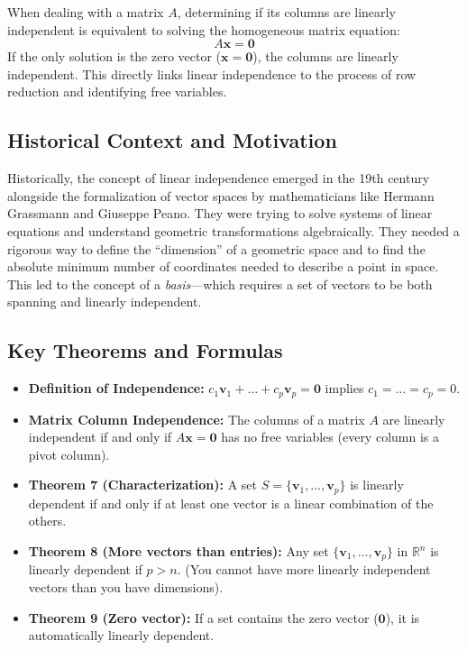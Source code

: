 \documentclass[11pt]{article}
\begin{document}
When dealing with a matrix $A$, determining if its columns are linearly independent is equivalent to solving the homogeneous matrix equation:
\[ A\mathbf{x} = \mathbf{0} \]
If the only solution is the zero vector ($\mathbf{x} = \mathbf{0}$), the columns are linearly independent. This directly links linear independence to the process of row reduction and identifying free variables.

\subsection{Historical Context and Motivation}
Historically, the concept of linear independence emerged in the 19th century alongside the formalization of vector spaces by mathematicians like Hermann Grassmann and Giuseppe Peano. They were trying to solve systems of linear equations and understand geometric transformations algebraically. They needed a rigorous way to define the ``dimension'' of a geometric space and to find the absolute minimum number of coordinates needed to describe a point in space. This led to the concept of a \textit{basis}---which requires a set of vectors to be both spanning and linearly independent.

\subsection{Key Theorems and Formulas}
\begin{itemize}
    \item \textbf{Definition of Independence:} $c_1\mathbf{v}_1 + \dots + c_p\mathbf{v}_p = \mathbf{0}$ implies $c_1 = \dots = c_p = 0$.
    \item \textbf{Matrix Column Independence:} The columns of a matrix $A$ are linearly independent if and only if $A\mathbf{x} = \mathbf{0}$ has no free variables (every column is a pivot column).
    \item \textbf{Theorem 7 (Characterization):} A set $S = \{\mathbf{v}_1, \dots, \mathbf{v}_p\}$ is linearly dependent if and only if at least one vector is a linear combination of the others.
    \item \textbf{Theorem 8 (More vectors than entries):} Any set $\{\mathbf{v}_1, \dots, \mathbf{v}_p\}$ in $\mathbb{R}^n$ is linearly dependent if $p > n$. (You cannot have more linearly independent vectors than you have dimensions).
    \item \textbf{Theorem 9 (Zero vector):} If a set contains the zero vector ($\mathbf{0}$), it is automatically linearly dependent.
\end{itemize}
\end{document}
